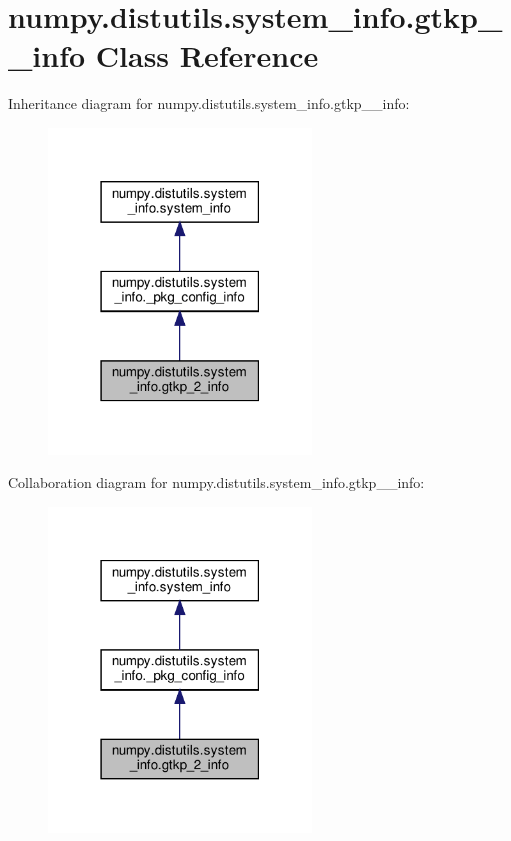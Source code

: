 \hypertarget{classnumpy_1_1distutils_1_1system__info_1_1gtkp__2__info}{}\section{numpy.\+distutils.\+system\+\_\+info.\+gtkp\+\_\+\_\+info Class Reference}
\label{classnumpy_1_1distutils_1_1system__info_1_1gtkp__2__info}


Inheritance diagram for numpy.\+distutils.\+system\+\_\+info.\+gtkp\+\_\+\_\+info\+:
\nopagebreak
\begin{figure}[H]
\begin{center}
\leavevmode
\includegraphics[width=198pt]{classnumpy_1_1distutils_1_1system__info_1_1gtkp__2__info__inherit__graph}
\end{center}
\end{figure}


Collaboration diagram for numpy.\+distutils.\+system\+\_\+info.\+gtkp\+\_\+\_\+info\+:
\nopagebreak
\begin{figure}[H]
\begin{center}
\leavevmode
\includegraphics[width=198pt]{classnumpy_1_1distutils_1_1system__info_1_1gtkp__2__info__coll__graph}
\end{center}
\end{figure}
